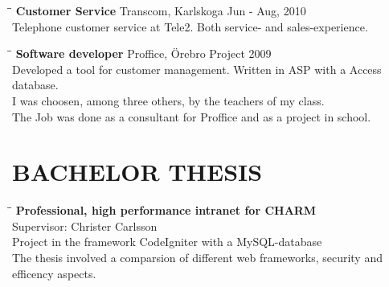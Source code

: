 \documentclass[11pt]{res}
\begin{document}
\begin{resume}
\vspace{-30pt}

	   \begin{tabbing}
		 \hspace{2.3in}\= \hspace{2.6in}\= \kill %
		 {\bf Customer Service} \>Transcom, Karlskoga    \>Jun - Aug, 2010\\
		 Telephone customer service at Tele2. Both service- and sales-experience. 
	   \end{tabbing}

\vspace{-30pt}     

	  \begin{tabbing}
		  \hspace{2.3in}\= \hspace{2.6in}\= \kill %
		  {\bf Software developer} \>Proffice, Örebro \>Project 2009\\
		  Developed a tool for customer management. Written in ASP with a Access database. \\ I was choosen, among three others, by the teachers of my class. \\ The Job was done as a consultant for Proffice and as a project in school. 
	  \end{tabbing}


\section{BACHELOR THESIS}
\vspace{-0.1in}
	\begin{tabbing}
		\hspace{2.3in}\= \hspace{2.6in}\= \kill %
	 	{\bf Professional, high performance intranet for CHARM} \>	\\
	 	Supervisor:  Christer Carlsson                    \> 	\> 2012 \\
		Project in the framework CodeIgniter with a MySQL-database \\
		The thesis involved a comparsion of different web frameworks, security and efficency aspects. 
	 \end{tabbing}



\end{resume}
\end{document}
